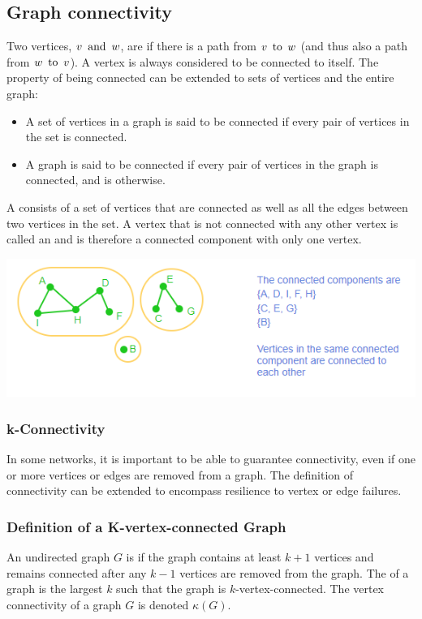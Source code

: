 \subsection{Graph connectivity}
Two vertices, $v \operatorname{~\text{and}~} w$, are  if there is a path from $v \operatorname{~\text{to}~} w$ (and thus also a path from $w \operatorname{~\text{to}~} v$). A vertex is always considered to be connected to itself. The property of being connected can be extended to sets of vertices and the entire graph:
\begin{itemize}
  \item A set of vertices in a graph is said to be connected if every pair of vertices in the set is connected.
  \item A graph is said to be connected if every pair of vertices in the graph is connected, and is  otherwise.
\end{itemize}
A  consists of a  set of vertices that are connected as well as all the edges between two vertices in the set. A vertex that is not connected with any other vertex is called an  and is therefore a connected component with only one vertex.
\begin{center}
  \includegraphics[width=0.6\linewidth]{resources/connected components example.png}
\end{center}

\subsubsection*{k-Connectivity}
In some networks, it is important to be able to guarantee connectivity, even if one or more vertices or edges are removed from a graph. The definition of connectivity can be extended to encompass resilience to vertex or edge failures.

\subsubsection*{Definition of a K-vertex-connected Graph}
An undirected graph $G$ is  if the graph contains at least $k + 1$ vertices and remains connected after any $k - 1$ vertices are removed from the graph. The  of a graph is the largest $k$ such that the graph is $k$-vertex-connected. The vertex connectivity of a graph $G$ is denoted $\kappa(G)$.

